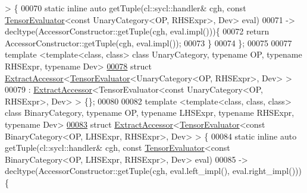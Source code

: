 \begin{DoxyCode}
       > \{
00070   \textcolor{keyword}{static} \textcolor{keyword}{inline} \textcolor{keyword}{auto} getTuple(cl::sycl::handler& cgh, \textcolor{keyword}{const} \hyperlink{struct_eigen_1_1_tensor_evaluator}{TensorEvaluator}<\textcolor{keyword}{const} 
      UnaryCategory<OP, RHSExpr>, Dev> eval)
00071   -> decltype(AccessorConstructor::getTuple(cgh, eval.impl()))\{
00072     \textcolor{keywordflow}{return} AccessorConstructor::getTuple(cgh, eval.impl());
00073   \}
00074 \};
00075 
00077 \textcolor{keyword}{template} <\textcolor{keyword}{template}<\textcolor{keyword}{class}, \textcolor{keyword}{class}> \textcolor{keyword}{class }UnaryCategory, \textcolor{keyword}{typename} OP, \textcolor{keyword}{typename} RHSExpr, \textcolor{keyword}{typename} Dev>
\hyperlink{struct_eigen_1_1_tensor_sycl_1_1internal_1_1_extract_accessor_3_01_tensor_evaluator_3_01_unary_ced118e7150af1b3484bed90bd93eaab6}{00078} \textcolor{keyword}{struct }\hyperlink{struct_eigen_1_1_tensor_sycl_1_1internal_1_1_extract_accessor}{ExtractAccessor}<\hyperlink{struct_eigen_1_1_tensor_evaluator}{TensorEvaluator}<UnaryCategory<OP, RHSExpr>, Dev> >
00079 : \hyperlink{struct_eigen_1_1_tensor_sycl_1_1internal_1_1_extract_accessor}{ExtractAccessor}<TensorEvaluator<const UnaryCategory<OP, RHSExpr>, Dev> > \{\};
00080 
00082 \textcolor{keyword}{template} <\textcolor{keyword}{template}<\textcolor{keyword}{class}, \textcolor{keyword}{class}, \textcolor{keyword}{class}> \textcolor{keyword}{class }BinaryCategory, \textcolor{keyword}{typename} OP,  \textcolor{keyword}{typename} LHSExpr, \textcolor{keyword}{typename} 
      RHSExpr, \textcolor{keyword}{typename} Dev>
\hyperlink{struct_eigen_1_1_tensor_sycl_1_1internal_1_1_extract_accessor_3_01_tensor_evaluator_3_01const_01b2d1164787704459976e801609bbec58}{00083} \textcolor{keyword}{struct }\hyperlink{struct_eigen_1_1_tensor_sycl_1_1internal_1_1_extract_accessor}{ExtractAccessor}<\hyperlink{struct_eigen_1_1_tensor_evaluator}{TensorEvaluator}<const BinaryCategory<OP, LHSExpr, 
      RHSExpr>, Dev> > \{
00084   \textcolor{keyword}{static} \textcolor{keyword}{inline} \textcolor{keyword}{auto} getTuple(cl::sycl::handler& cgh, \textcolor{keyword}{const} \hyperlink{struct_eigen_1_1_tensor_evaluator}{TensorEvaluator}<\textcolor{keyword}{const} 
      BinaryCategory<OP, LHSExpr, RHSExpr>, Dev> eval)
00085   -> decltype(AccessorConstructor::getTuple(cgh, eval.left\_impl(), eval.right\_impl()))\{

\end{DoxyCode}
